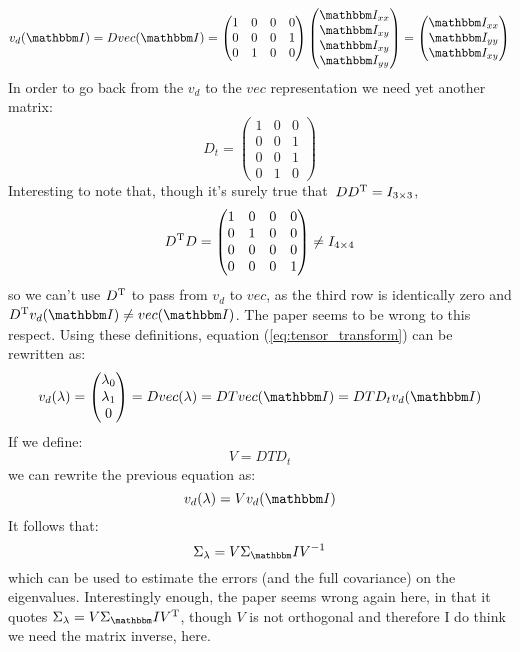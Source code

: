 \documentclass[a4paper,11pt]{article}
\newcommand{\itm}{\mathbbm I}
\newcommand{\itc}[1]{\itm_{#1}}
\begin{document}
\begin{equation}
  v_d(\itm) = D vec(\itm) =
  \begin{pmatrix}
    1 & 0 & 0 & 0\\
    0 & 0 & 0 & 1\\
    0 & 1 & 0 & 0
  \end{pmatrix}
  \begin{pmatrix}
    \itc{xx}\\
    \itc{xy}\\
    \itc{xy}\\
    \itc{yy}
  \end{pmatrix} = 
  \begin{pmatrix}
    \itc{xx}\\
    \itc{yy}\\
    \itc{xy}
  \end{pmatrix}
\end{equation}
In order to go back from the $v_d$ to the $vec$ representation we need
yet another matrix:
\begin{equation}
  D_t = 
  \begin{pmatrix}
    1 & 0 & 0\\
    0 & 0 & 1\\
    0 & 0 & 1\\
    0 & 1 & 0
  \end{pmatrix}
\end{equation}
Interesting to note that, though it's surely true that\
$DD^{\rm T} = I_{3\times3}$,
$$
D^{\rm T}D = 
\begin{pmatrix}
  1 & 0 & 0 & 0\\
  0 & 1 & 0 & 0\\
  0 & 0 & 0 & 0\\
  0 & 0 & 0 & 1
\end{pmatrix}
\neq I_{4\times4}
$$
so we can't use $D^{\rm T}$ to pass from $v_d$ to $vec$, as the third row is
identically zero and $D^{\rm T}v_d(\itm) \neq vec(\itm)$.
The paper \cite{errors} seems to be wrong to this respect.
Using these definitions, equation (\ref{eq:tensor_transform}) can be rewritten
as:
\begin{equation}
  v_d(\lambda) =
  \begin{pmatrix}
    \lambda_0\\
    \lambda_1\\
    0
  \end{pmatrix} =
  D vec(\lambda) = DT vec(\itm) = DTD_t v_d(\itm)
\end{equation}
If we define:
\begin{equation}
  V = DTD_t
\end{equation}
we can rewrite the previous equation as:
\begin{equation}
  v_d(\lambda) = V v_d(\itm)
\end{equation}
It follows that:
\begin{equation}
\Sigma_\lambda = V \Sigma_\itm V^{-1}
\end{equation}
which can be used to estimate the errors (and the full covariance) on the
eigenvalues. Interestingly enough, the paper seems wrong again here, in that
it quotes $\Sigma_\lambda = V \Sigma_\itm V^{\rm T}$, though $V$ is not
orthogonal and therefore I do think we need the matrix inverse, here.
\end{document}
